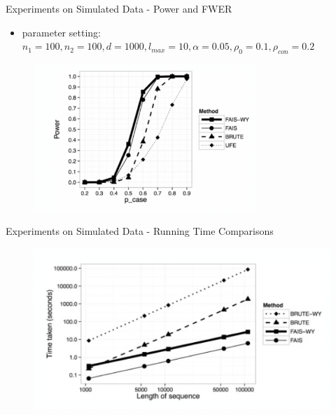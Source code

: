 \documentclass[aspectratio=32, 10pt]{beamer}
\begin{document}
\begin{frame}[fragile]{Experiments on Simulated Data - Power and FWER}
\begin{itemize}
    \item parameter setting: $n_1 = 100, n_2 = 100, d = 1000, l_{max} = 10, \alpha = 0.05, \rho_0 = 0.1, \rho_{con} = 0.2$
\end{itemize}
\begin{figure}
    \centering
    \includegraphics[width=0.75\textwidth]{figures/power_fwer.png}
\end{figure}
\end{frame}

\begin{frame}[fragile]{Experiments on Simulated Data - Running Time Comparisons}
\begin{figure}
    \centering
    \includegraphics[width=\textwidth]{figures/runtime.png}
\end{figure}
\end{frame}
\end{document}
